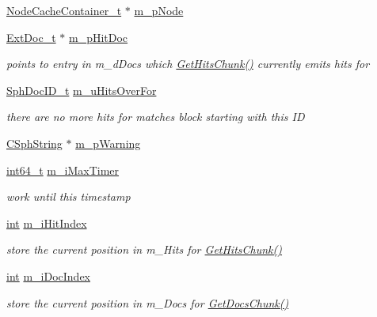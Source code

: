 \begin{DoxyCompactItemize}
\item 
\hyperlink{classNodeCacheContainer__t}{Node\-Cache\-Container\-\_\-t} $\ast$ \hyperlink{classExtNodeCached__t_ad6f644a8b54f3f30f8fbc46b4f8b41b5}{m\-\_\-p\-Node}
\item 
\hyperlink{structExtDoc__t}{Ext\-Doc\-\_\-t} $\ast$ \hyperlink{classExtNodeCached__t_a3db29986e63869150824a3966835df93}{m\-\_\-p\-Hit\-Doc}
\begin{DoxyCompactList}\small\item\em points to entry in m\-\_\-d\-Docs which \hyperlink{classExtNodeCached__t_a0b357bc4f7153168b4919433a4ffb747}{Get\-Hits\-Chunk()} currently emits hits for \end{DoxyCompactList}\item 
\hyperlink{sphinx_8h_a3176771631c12a9e4897272003e6b447}{Sph\-Doc\-I\-D\-\_\-t} \hyperlink{classExtNodeCached__t_a84a67429327afeaaa967f5f5a9fa4ad6}{m\-\_\-u\-Hits\-Over\-For}
\begin{DoxyCompactList}\small\item\em there are no more hits for matches block starting with this I\-D \end{DoxyCompactList}\item 
\hyperlink{structCSphString}{C\-Sph\-String} $\ast$ \hyperlink{classExtNodeCached__t_a81332257ff6e159ba82b8103ae1dc317}{m\-\_\-p\-Warning}
\item 
\hyperlink{sphinxstd_8h_a996e72f71b11a5bb8b3b7b6936b1516d}{int64\-\_\-t} \hyperlink{classExtNodeCached__t_a452ccbcf4398b2aa51c70e222cff7fb7}{m\-\_\-i\-Max\-Timer}
\begin{DoxyCompactList}\small\item\em work until this timestamp \end{DoxyCompactList}\item 
\hyperlink{sphinxexpr_8cpp_a4a26e8f9cb8b736e0c4cbf4d16de985e}{int} \hyperlink{classExtNodeCached__t_a668473b25ec6f1df2163bd4a6f18da9e}{m\-\_\-i\-Hit\-Index}
\begin{DoxyCompactList}\small\item\em store the current position in m\-\_\-\-Hits for \hyperlink{classExtNodeCached__t_a0b357bc4f7153168b4919433a4ffb747}{Get\-Hits\-Chunk()} \end{DoxyCompactList}\item 
\hyperlink{sphinxexpr_8cpp_a4a26e8f9cb8b736e0c4cbf4d16de985e}{int} \hyperlink{classExtNodeCached__t_ac5fb49a1b0412d2368169b2908e72abe}{m\-\_\-i\-Doc\-Index}
\begin{DoxyCompactList}\small\item\em store the current position in m\-\_\-\-Docs for \hyperlink{classExtNodeCached__t_a3f16526caad3bd9e4a846db9007ea950}{Get\-Docs\-Chunk()} \end{DoxyCompactList}\item 

\end{DoxyCompactItemize}
